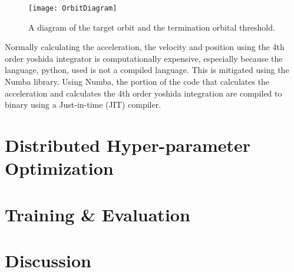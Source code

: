 \begin{figure}
	\centering
	\texttt{[image: OrbitDiagram]}
	\caption{A diagram of the target orbit and the termination orbital threshold.}
	\label{fig:OrbitDiagram}
\end{figure}

Normally calculating the acceleration, the velocity and position using the 4th order yoshida integrator is computationally expensive, especially because the language, python, used is not a compiled language. This is mitigated using the Numba \cite{10.1145/2833157.2833162} library. Using Numba, the portion of the code that calculates the acceleration and calculates the 4th order yoshida integration are compiled to binary using a Just-in-time (JIT) compiler.
	
\section{Distributed Hyper-parameter Optimization}

\section{Training \& Evaluation}

\section{Discussion}